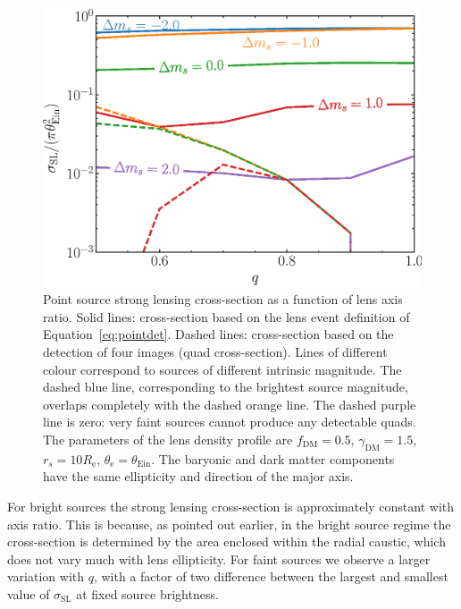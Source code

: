 \documentclass{aa}
\def\reff{R_{\mathrm{e}}}
\def\gammadm{\gamma_{\mathrm{DM}}}
\def\fdm{f_{\mathrm{DM}}}
\def\tein{\theta_{\mathrm{Ein}}}
\def\teff{\theta_{\mathrm{e}}}
\def\crosssect{\sigma_\mathrm{{SL}}}
\def\Eref#1{Equation~\ref{#1}\xspace}
\begin{document}
\begin{figure}
\includegraphics[width=\columnwidth]{ell_pnt_cs.eps}
\caption{
Point source strong lensing cross-section as a function of lens axis ratio.
Solid lines: cross-section based on the lens event definition of \Eref{eq:pointdet}.
Dashed lines: cross-section based on the detection of four images (quad cross-section).
Lines of different colour correspond to sources of different intrinsic magnitude.
The dashed blue line, corresponding to the brightest source magnitude, overlaps completely with the dashed orange line.
The dashed purple line is zero: very faint sources cannot produce any detectable quads.
The parameters of the lens density profile are $\fdm=0.5$, $\gammadm=1.5$, $r_s=10\reff$, $\teff=\tein$.
The baryonic and dark matter components have the same ellipticity and direction of the major axis.
\label{fig:ellpoint_cs}
}
\end{figure}

For bright sources the strong lensing cross-section is approximately constant with axis ratio. This is because, as pointed out earlier, in the bright source regime the cross-section is determined by the area enclosed within the radial caustic, which does not vary much with lens ellipticity.
For faint sources we observe a larger variation with $q$, with a factor of two difference between the largest and smallest value of $\crosssect$ at fixed source brightness.
\end{document}
